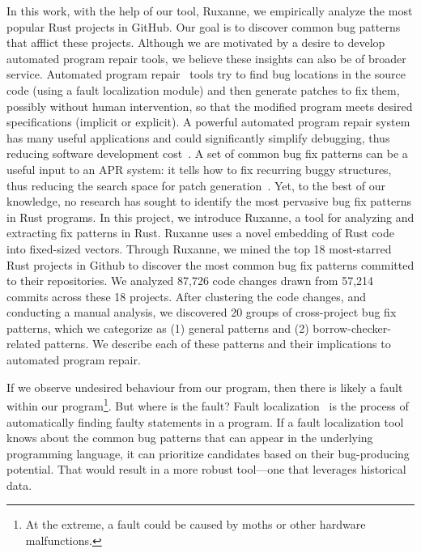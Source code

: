 In this work, with the help of our tool, Ruxanne, we empirically analyze the most popular Rust projects in GitHub. Our goal is to discover common bug patterns that afflict these projects. Although we are motivated by a desire to develop automated program repair tools, we believe these insights can also be of broader service. Automated program repair~\citep{goues2019automated,liu2018survey} tools try to find bug locations in the source code (using a fault localization module) and then generate patches to fix them, possibly without human intervention, so that the modified program meets desired specifications (implicit or explicit). A powerful automated program repair system has many useful applications and could significantly simplify debugging, thus reducing software development cost~\citep{le2012systematic}. A set of common bug fix patterns can be a useful input to an APR system: it tells how to fix recurring buggy structures, thus reducing the search space for patch generation~\citep{jeffrey2009bugfix}. 
Yet, to the best of our knowledge, no research has sought to identify the most pervasive bug fix patterns in Rust programs. In this project, we introduce Ruxanne, a tool for analyzing and extracting fix patterns in Rust. Ruxanne uses a novel embedding of Rust code into fixed-sized vectors. Through Ruxanne, we mined the top 18 most-starred Rust projects in Github to discover the most common bug fix patterns committed to their repositories. We analyzed 87,726 code changes drawn from 57,214 commits across these 18 projects. After clustering the code changes, and conducting a manual analysis, we discovered 20 groups of cross-project bug fix patterns, which we categorize as (1) general patterns and (2) borrow-checker-related patterns. We describe each of these patterns and their implications to automated program repair.

If we observe undesired behaviour from our program, then there is likely a fault within our program\footnote{At the extreme, a fault could be caused by moths or other hardware malfunctions.}. But where is the fault? Fault localization~\citep{wong2016survey} is the process of automatically finding faulty statements in a program. If a fault localization tool knows about the common bug patterns that can appear in the underlying programming language, it can prioritize candidates based on their bug-producing potential. That would result in a more robust tool---one that leverages historical data.

